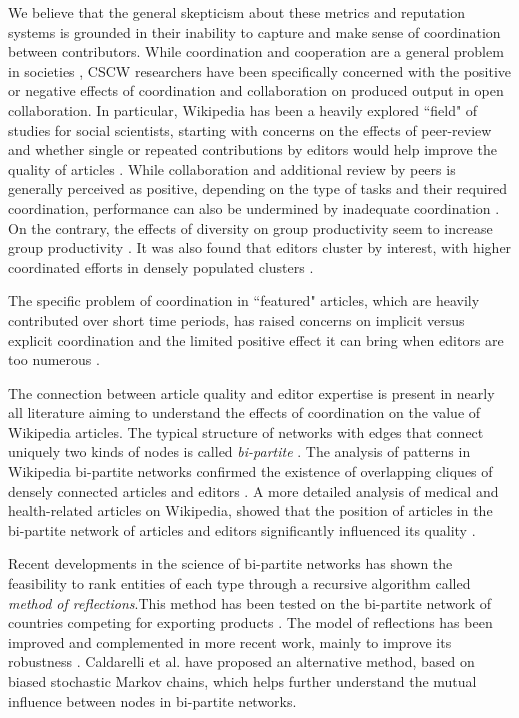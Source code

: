 We believe that the general skepticism about these metrics and reputation systems is grounded in their inability to capture and make sense of coordination between contributors. While coordination and cooperation are a general problem in societies \cite{ostrom1990}, CSCW researchers have been specifically concerned with the positive or negative effects of coordination and collaboration on produced output in open collaboration. In particular, Wikipedia has been a heavily explored ``field" of studies for social scientists, starting with concerns on the effects of peer-review and whether single or repeated contributions by editors would help improve the quality of articles \cite{hu2007articlequality,wilkinson2007}. While collaboration and additional review by peers is generally perceived as positive, depending on the type of tasks and their required coordination, performance can also be undermined by inadequate coordination \cite{kittur2009coordination}. On the contrary, the effects of diversity on group productivity seem to increase group productivity \cite{chen2010}. It was also found that editors cluster by interest, with higher coordinated efforts in densely populated clusters \cite{jesus2009}. 

The specific problem of coordination in ``featured" articles, which are heavily contributed over short time periods, has raised concerns on implicit versus explicit coordination and the limited positive effect it can bring when editors are too numerous \cite{kittur2008}. 
 
The connection between article quality and editor expertise is present in nearly all literature aiming to understand the effects of coordination on the value of Wikipedia articles. The typical structure of networks with edges that connect uniquely two kinds of nodes is called {\it bi-partite} \cite{newman2001}. The analysis of patterns in Wikipedia bi-partite networks confirmed the existence of overlapping cliques of densely connected articles and editors  \cite{jesus2009}. A more detailed analysis of medical and health-related articles on Wikipedia, showed that the position of articles in the bi-partite network of articles and editors significantly influenced its quality \cite{kane2009}. 

Recent developments in the science of bi-partite networks has shown the feasibility to rank entities of each type through a recursive algorithm called  {\it method of reflections}.This method has been tested on the bi-partite network of countries competing for exporting products \cite{hidalgo2007,hidalgo2009}. The model of reflections has been improved and complemented in more recent work, mainly to improve its robustness \cite{tacchella2012new, cristelli2012competitors, tacchella2013economic, cristelli2013measuring}. Caldarelli et al. \cite{caldarelli2012network} have proposed an alternative method, based on biased stochastic Markov chains, which helps further understand the mutual influence between nodes in bi-partite networks.




